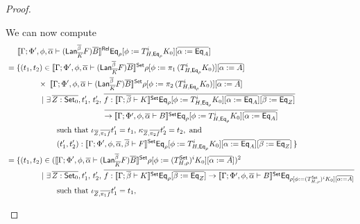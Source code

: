 \documentclass[acmsmall,review,anonymous]{acmart}
\theoremstyle{definition}
\newcommand{\set}{\mathsf{Set}}
\begin{document}
\begin{proof}
\begin{itemize}
\begin{itemize}
{%
We can now compute 
\begin{align*}
&\hspace*{0.2in}\oCPORsem{\Gamma;\Phi',\phi,\ol\alpha
    \vdash (\Lan_{\ol K}^{\ol \beta} F)\ol{B}}  \Eq_{\rho} [\phi :=
    T^i_{H,\Eq_{\rho}} K_0] [\overline{\alpha := \Eq_A}]\\
&= \{(t_1,t_2) \in \oCPOsem{\Gamma;\Phi',\phi,\ol\alpha
    \vdash (\Lan_{\ol K}^{\ol \beta} F)\ol{B}} \rho [\phi := \pi_1\,
    (T^i_{H,\Eq_{\rho}} K_0)] [\overline{\alpha := A}]\\
& \hspace*{0.57in}\times\;
  \oCPOsem{\Gamma;\Phi',\phi,\ol\alpha \vdash (\Lan_{\ol
      K}^{\ol \beta} F)\ol{B}} \rho [\phi := \pi_2\,
    (T^i_{H,\Eq_{\rho}} K_0)] [\overline{\alpha := A}]\\
  & \hspace*{0.63in}|~\exists\, \ol{Z : \oCPO_0}, t_1',\, t_2',\,
  \ol{f : \oCPOsem{\Gamma;\ol\beta \vdash K} \Eq_\rho
  [\phi := T^i_{H,\Eq_{\rho}} K_0] [\overline{\alpha := \Eq_A}]
  [\overline{\beta := \Eq_Z}]}\\
  & \hspace*{1.75in}\ol{\to \oCPOsem{\Gamma;\Phi',
    \phi,\ol\alpha \vdash B} \Eq_\rho [\phi := T^i_{H,\Eq_{\rho}} K_0]
  [\overline{\alpha := \Eq_A}]}\\
  &\hspace{0.9in}\mbox{such that } \iota_{\ol Z, \ol{\pi_1 f}}t_1' = t_1,\,
  \kappa_{\ol Z,\ol{\pi_2 f}}t_2' = t_2, \mbox{ and }\\
  &\hspace*{0.9in}(t_1',t_2') : \oCPOsem{\Gamma;\Phi',
    \phi,\ol\alpha,\ol\beta \vdash F} \Eq_\rho [\phi := T^i_{H,\Eq_{\rho}} K_0]
  [\overline{\alpha := \Eq_A}][\ol{\beta :=\Eq_Z}]\,\}\\
%
  &= \{(t_1,t_2) \in (\oCPOsem{\Gamma;\Phi',\phi,\ol\alpha
    \vdash (\Lan_{\ol K}^{\ol \beta} F)\ol{B}} \rho [\phi := 
    (T^\set_{H,{\rho}})^i K_0] [\overline{\alpha := A}])^2\\
  & \hspace*{0.63in}|~\exists\, \ol{Z : \oCPO_0}, t_1',\, t_2',\,
  \ol{f : \oCPOsem{\Gamma;\ol\beta \vdash K} \Eq_\rho[\overline{\beta :=
      \Eq_Z}]\to \oCPOsem{\Gamma;\Phi',
    \phi,\ol\alpha \vdash B} \Eq_{\rho[\phi := (T^\set_{H,{\rho}})^i K_0] 
  [\overline{\alpha := A}]}}\\
  &\hspace{0.9in}\mbox{such that } \iota_{\ol Z,\ol{\pi_1 f}}t_1' = t_1,\,

\end{align*}}
\end{itemize}
\end{itemize}
\end{proof}
\end{document}
